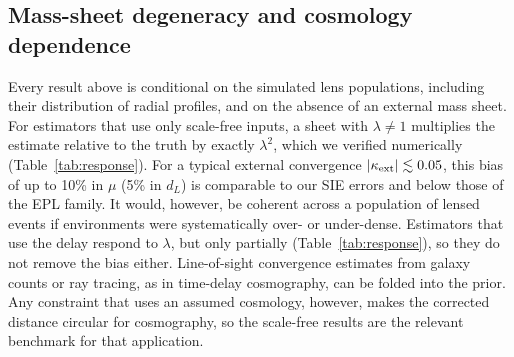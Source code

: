 \subsection{Mass-sheet degeneracy and cosmology dependence}
Every result above is conditional on the simulated lens populations, including their distribution of radial profiles, and on the absence of an external mass sheet. For estimators that use only scale-free inputs, a sheet with $\lambda\neq1$ multiplies the estimate relative to the truth by exactly $\lambda^2$, which we verified numerically (Table~\ref{tab:response}). For a typical external convergence $|\kappa_{\rm ext}|\lesssim0.05$, this bias of up to 10\% in $\mu$ (5\% in $d_L$) is comparable to our SIE errors and below those of the EPL family. It would, however, be coherent across a population of lensed events if environments were systematically over- or under-dense. Estimators that use the delay respond to $\lambda$, but only partially (Table~\ref{tab:response}), so they do not remove the bias either. Line-of-sight convergence estimates from galaxy counts or ray tracing, as in time-delay cosmography, can be folded into the prior. Any constraint that uses an assumed cosmology, however, makes the corrected distance circular for cosmography, so the scale-free results are the relevant benchmark for that application.

